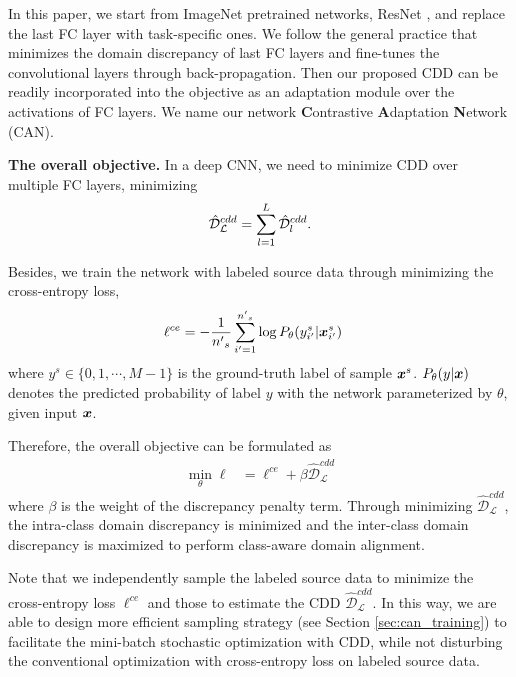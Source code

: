 \documentclass[10pt,twocolumn,letterpaper]{article}
\begin{document}
In this paper, we start from ImageNet \cite{deng2009imagenet} pretrained networks, \eg ResNet \cite{he2016deep,he2016identity},
and replace the last FC layer with task-specific ones.
We follow the general practice that minimizes the domain discrepancy of last FC layers 
and fine-tunes the convolutional layers through back-propagation. 
Then our proposed CDD can be readily incorporated into the objective as  
an adaptation module
over the activations of FC layers.
We name our network \textbf{C}ontrastive \textbf{A}daptation \textbf{N}etwork (CAN).









\textbf{The overall objective.}
In a deep CNN,
we need to minimize CDD over multiple FC layers, \ie
minimizing
\begin{align}
\hat{\mathcal{D}}^{cdd}_\mathcal{L} = \sum_{l=1}^{L}{\hat{\mathcal{D}}_l^{cdd}}.
\label{cdd-l}
\end{align}



Besides,
we train the network with labeled source data through minimizing the cross-entropy loss,
\begin{align}
\ell^{ce} &= -\frac{1}{n{'}_s}\sum_{i{'}=1}^{n{'}_s}{\log{P_\theta(y^s_{i{'}}|\boldsymbol{x}^s_{i{'}})}}
\label{ce-loss}
\end{align}
where $y^s \in \{0, 1, \cdots, M-1\} $ is the ground-truth label of sample $\boldsymbol{x}^s$.
$P_\theta(y|\boldsymbol{x})$ denotes the predicted probability of label ${y}$ with the network 
parameterized by $\theta$, given input $\boldsymbol{x}$.

Therefore, the overall objective can be formulated as  
\begin{align}
\min_\theta \ell &= \ell^{ce} + \beta \hat{\mathcal{D}}^{cdd}_\mathcal{L} \label{obj-full}
\end{align}
where 
$\beta$ is the weight of the discrepancy penalty term.
Through minimizing $\hat{\mathcal{D}}^{cdd}_\mathcal{L}$,
the intra-class domain discrepancy is minimized and the inter-class domain discrepancy is maximized
to perform class-aware domain alignment. 

Note that we independently sample the labeled source data 
to minimize the cross-entropy loss $\ell^{ce}$
and those to estimate the CDD $\hat{\mathcal{D}}^{cdd}_\mathcal{L}$.
In this way, we are able to design more efficient sampling strategy (see Section \ref{sec:can_training}) to facilitate the mini-batch stochastic optimization with CDD,
while not disturbing the conventional optimization with cross-entropy loss on labeled source data.
\end{document}
